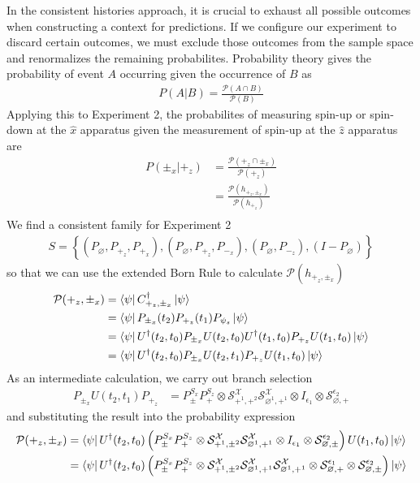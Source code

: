In the consistent histories approach, it is crucial to exhaust all possible outcomes when constructing a context for predictions. If we configure our experiment to discard certain outcomes, we must exclude those outcomes from the sample space and renormalizes the remaining probabilites. Probability theory gives the probability of event $A$ occurring given the occurrence of $B$ as
\begin{align}
  P(A|B) = \frac{\mathcal{P}(A\cap B)}{\mathcal{P}(B)}
\end{align}
Applying this to Experiment 2, the probabilites of measuring spin-up or spin-down at the $\hat{x}$ apparatus given the measurement of spin-up at the $\hat{z}$ apparatus are
\begin{align} \label{eq: conditional consecutive probability}
  P(\pm_x|+_z) &= \frac{{\mathcal{P}(+_z\cap \pm_x)}}{{\mathcal{P}(+_z)}} \\ \nonumber
  &= \frac{\mathcal{P}(h_{+_z, \pm_x})}{\mathcal{P}(h_{+_z})} \\ \nonumber
\end{align}
We find a consistent family for Experiment 2
\begin{align}
  S = \left\{\left(P_\varnothing, P_{+_z}, P_{+_x} \right), \left(P_\varnothing, P_{+_z}, P_{-_x} \right), \left(P_\varnothing, P_{-_z} \right), \left(I - P_\varnothing \right) \right\}
\end{align}
so that we can use the extended Born Rule to calculate $\mathcal{P}(h_{+_z, \pm_x})$
\begin{align}
  \mathcal{P}(+_z, \pm_x) &= \bra{\psi} C^\dagger_{+_z, \pm_x} \ket{\psi} \\ \nonumber
  &= \bra{\psi} P_{\pm_x}(t_2) P_{+_z}(t_1) P_{\psi_s} \ket{\psi} \\ \nonumber
  &= \bra{\psi} U^\dagger(t_2, t_0) P_{\pm_x} U(t_2, t_0) U^\dagger(t_1, t_0) P_{+_z} U(t_1, t_0)  \ket{\psi} \\ \nonumber
  &= \bra{\psi} U^\dagger(t_2, t_0) P_{\pm_x} U(t_2, t_1) P_{+_z} U(t_1, t_0) \ket{\psi}
\end{align}
As an intermediate calculation, we carry out branch selection
\begin{align}
   P_{\pm_x} U(t_2, t_1) P_{+_z} &= P^{S_x}_\pm P^{S_z}_+ \otimes \mathcal{S}^\mathcal{X}_{+^1, +^2} \mathcal{S}^\mathcal{X}_{\varnothing^1, +^1} \otimes I_{\epsilon_1} \otimes \mathcal{S}^{\epsilon_2}_{\varnothing, +}
\end{align}
and substituting the result into the probability expression
\begin{align}
  \mathcal{P}(+_z, \pm_x) &= \bra{\psi} U^\dagger(t_2, t_0) \left(P^{S_x}_\pm P^{S_z}_+ \otimes \mathcal{S}^\mathcal{X}_{+^1, \pm^2} \mathcal{S}^\mathcal{X}_{\varnothing^1, +^1} \otimes I_{\epsilon_1} \otimes \mathcal{S}^{\epsilon_2}_{\varnothing, \pm} \right) U(t_1, t_0) \ket{\psi} \\ \nonumber
  &= \bra{\psi}  U^\dagger(t_2, t_0) \left(P^{S_x}_\pm P^{S_z}_+ \otimes \mathcal{S}^\mathcal{X}_{+^1, \pm^2} \mathcal{S}^\mathcal{X}_{ \varnothing^1, +^1}  \mathcal{S}^{\mathcal{X}}_{\varnothing^1, +^1} \otimes \mathcal{S}^{\epsilon_1}_{\varnothing, +} \otimes \mathcal{S}^{\epsilon_2}_{\varnothing, \pm} \right) \ket{\psi}
\end{align}

